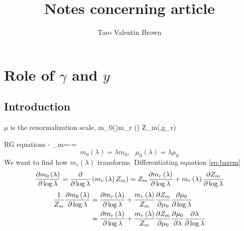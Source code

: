 \documentclass[a4,10pt,titlepage]{article}
\begin{document}
	\title{\textbf{Notes concerning article}}
	\author{Taro Valentin Brown}
	\maketitle
	\section{Role of $\gamma$ and $y$}
	\subsection{Introduction}
$\mu$ is the renormalization scale,
\be \label{eq:barem}
m_0\lp(\lambda \rp)\equiv m_r \lp(\lambda \rp) Z_m(\epsilon,g_r)
\ee

RG equations
\be \label{eq:gammam}
- \gamma_m\equiv {}=-=
\ee
\[
m_0(\lambda)=\lambda m_0,\:\:\:\mu_0(\lambda)=\lambda \mu_0
\]
We want to find how $m_r(\lambda)$ transforms. Differentiating equation \ref{eq:barem}
\[
\pdv{m_0\left(\lambda \right)}{\log \lambda}=\pdv{}{\log \lambda}\left(m_r\left(\lambda \right) Z_m\right)=Z_m\pdv{m_r \left(\lambda \right)}{\log \lambda}+m_r\left(\lambda \right)\pdv{Z_m}{\log \lambda}
\]
\begin{align*}
\frac{1}{Z_m}\pdv{m_0\left(\lambda \right)}{\log \lambda}&=\pdv{m_r\left(\lambda \right)}{\log \lambda}+\frac{m_r\left(\lambda \right)}{Z_m}\pdv{Z_m}{\mu_0}\pdv{\mu_0}{\log \lambda}\\
&=\pdv{m_r\left(\lambda \right)}{\log \lambda}+\frac{m_r\left(\lambda \right)}{Z_m}\pdv{Z_m}{\mu_0}\pdv{\mu_0}{\lambda}\pdv{\lambda}{\log \lambda}
\end{align*}
\end{document}
